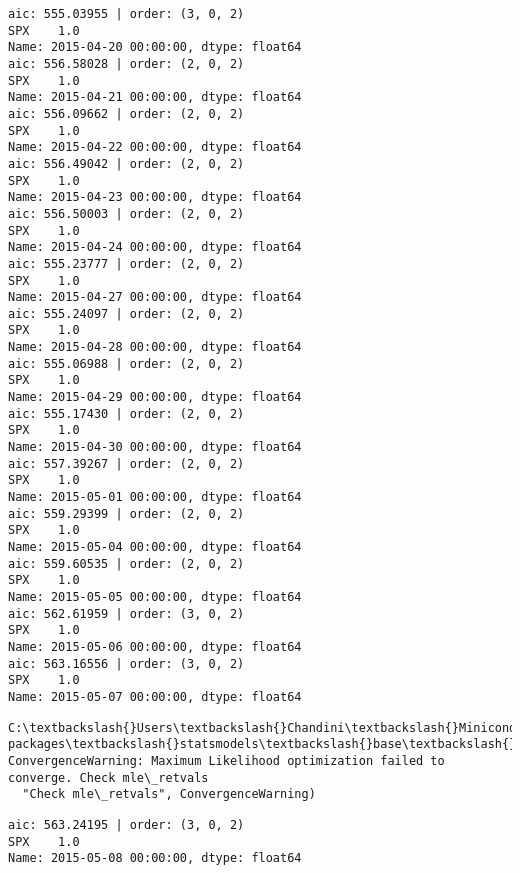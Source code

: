 \documentclass[11pt]{article}
\begin{document}
    \begin{Verbatim}[commandchars=\\\{\}]
aic: 555.03955 | order: (3, 0, 2)
SPX    1.0
Name: 2015-04-20 00:00:00, dtype: float64
aic: 556.58028 | order: (2, 0, 2)
SPX    1.0
Name: 2015-04-21 00:00:00, dtype: float64
aic: 556.09662 | order: (2, 0, 2)
SPX    1.0
Name: 2015-04-22 00:00:00, dtype: float64
aic: 556.49042 | order: (2, 0, 2)
SPX    1.0
Name: 2015-04-23 00:00:00, dtype: float64
aic: 556.50003 | order: (2, 0, 2)
SPX    1.0
Name: 2015-04-24 00:00:00, dtype: float64
aic: 555.23777 | order: (2, 0, 2)
SPX    1.0
Name: 2015-04-27 00:00:00, dtype: float64
aic: 555.24097 | order: (2, 0, 2)
SPX    1.0
Name: 2015-04-28 00:00:00, dtype: float64
aic: 555.06988 | order: (2, 0, 2)
SPX    1.0
Name: 2015-04-29 00:00:00, dtype: float64
aic: 555.17430 | order: (2, 0, 2)
SPX    1.0
Name: 2015-04-30 00:00:00, dtype: float64
aic: 557.39267 | order: (2, 0, 2)
SPX    1.0
Name: 2015-05-01 00:00:00, dtype: float64
aic: 559.29399 | order: (2, 0, 2)
SPX    1.0
Name: 2015-05-04 00:00:00, dtype: float64
aic: 559.60535 | order: (2, 0, 2)
SPX    1.0
Name: 2015-05-05 00:00:00, dtype: float64
aic: 562.61959 | order: (3, 0, 2)
SPX    1.0
Name: 2015-05-06 00:00:00, dtype: float64
aic: 563.16556 | order: (3, 0, 2)
SPX    1.0
Name: 2015-05-07 00:00:00, dtype: float64

    \end{Verbatim}

    \begin{Verbatim}[commandchars=\\\{\}]
C:\textbackslash{}Users\textbackslash{}Chandini\textbackslash{}Miniconda3\textbackslash{}envs\textbackslash{}auquan\textbackslash{}lib\textbackslash{}site-packages\textbackslash{}statsmodels\textbackslash{}base\textbackslash{}model.py:496: ConvergenceWarning: Maximum Likelihood optimization failed to converge. Check mle\_retvals
  "Check mle\_retvals", ConvergenceWarning)

    \end{Verbatim}

    \begin{Verbatim}[commandchars=\\\{\}]
aic: 563.24195 | order: (3, 0, 2)
SPX    1.0
Name: 2015-05-08 00:00:00, dtype: float64

    \end{Verbatim}
\end{document}
